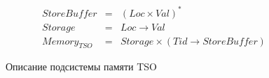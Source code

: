 \begin{figure}[hbt]
\begin{minipage}{\linewidth}

\[
\begin{array}{rcl}
StoreBuffer         & = &   (Loc \times Val)^*                                  \\
Storage             & = &   Loc \rightarrow Val                                 \\
Memory_{TSO}        & = &   Storage \times (Tid \rightarrow StoreBuffer)                 
\end{array}
\]

\end{minipage}
\caption{Описание подсистемы памяти TSO}
\label{fig:tso-subsys-def}
\end{figure}




